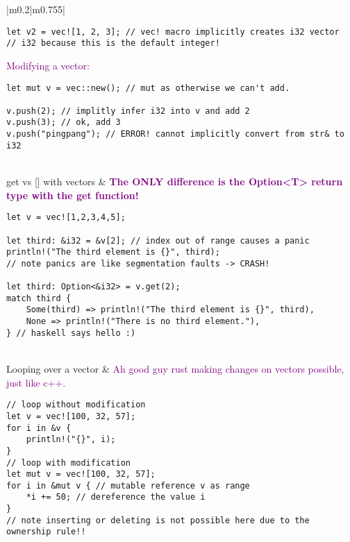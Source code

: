 \documentclass[main.tex,fontsize=8pt,paper=a4,paper=portrait,DIV=calc,]{scrartcl}
\begin{document}
\begin{table}[ht!]
\begin{tabular}{|m{0.2\linewidth}|m{0.755\linewidth}|}
\begin{lstlisting}
let v2 = vec![1, 2, 3]; // vec! macro implicitly creates i32 vector
// i32 because this is the default integer!
\end{lstlisting}
\textcolor{purple}{Modifying a vector:}\newline
\begin{lstlisting}
let mut v = vec::new(); // mut as otherwise we can't add.

v.push(2); // implitly infer i32 into v and add 2
v.push(3); // ok, add 3
v.push("pingpang"); // ERROR! cannot implicitly convert from str& to i32
\end{lstlisting}\\
\hline
get vs [] with vectors & 
\textcolor{purple}{\textbf{The ONLY difference is the Option<T> return type with the get function!}}\newline
\begin{lstlisting}
let v = vec![1,2,3,4,5];

let third: &i32 = &v[2]; // index out of range causes a panic
println!("The third element is {}", third);
// note panics are like segmentation faults -> CRASH!

let third: Option<&i32> = v.get(2);
match third {
    Some(third) => println!("The third element is {}", third),
    None => println!("There is no third element."),
} // haskell says hello :)
\end{lstlisting}\\
\hline
Looping over a vector & 
\textcolor{purple}{Ah good guy rust making changes on vectors possible, just like c++.}\newline
\begin{lstlisting}
// loop without modification
let v = vec![100, 32, 57];
for i in &v {
    println!("{}", i);
}
// loop with modification
let mut v = vec![100, 32, 57];
for i in &mut v { // mutable reference v as range
    *i += 50; // dereference the value i
}
// note inserting or deleting is not possible here due to the ownership rule!!
\end{lstlisting}\\
\hline
\end{tabular}
\end{table}
\pagebreak
\end{document}
